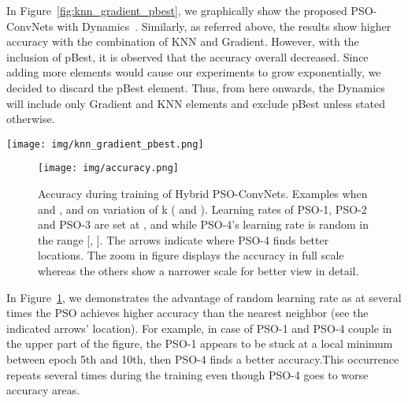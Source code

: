 \documentclass{ieeeaccess}
\begin{document}
In Figure~\ref{fig:knn_gradient_pbest}, we graphically show the proposed PSO-ConvNets with Dynamics~. Similarly, as referred above, the results show higher accuracy with the combination of KNN and Gradient. However, with the inclusion of pBest, it is observed that the accuracy overall decreased. Since adding more elements would cause our experiments to grow exponentially, we decided to discard the pBest element. Thus, from here onwards, the Dynamics~ will include only Gradient and KNN elements and exclude pBest unless stated otherwise.
\begin{figure*}[htb!]
\begin{center}
\texttt{[image: img/knn\_gradient\_pbest.png]}
\caption{Proposed PSO-ConvNets Dynamics~ (equation~\ref{eq:f1}). Comparison when KNN and Gradient are tested separated and combined, and also with the inclusion of pBest. Each column summaries the best accuracy of all PSOs (PSO-1, PSO-2, etc.). The red column highlights the best result for each group (KNN, Gradient, etc.).}
\label{fig:knn_gradient_pbest}
\end{center}
\end{figure*}
\begin{figure}[htb!]
\begin{center}
\texttt{[image: img/accuracy.png]}
\caption{Accuracy during training of Hybrid PSO-ConvNets. Examples when  and ,  and on variation of k ( and ). Learning rates of PSO-1, PSO-2 and PSO-3 are set at ,  and  while PSO-4's learning rate is random in the range [, ]. The arrows indicate where PSO-4 finds better locations. The zoom in figure displays the accuracy in full scale whereas the others show a narrower scale for better view in detail.}
\label{fig:accuracy}
\end{center}
\end{figure}


In Figure~\ref{fig:accuracy}, we demonstrates the advantage of random learning rate as at several times the PSO achieves higher accuracy than the nearest neighbor (see the indicated arrows' location). For example, in case of PSO-1 and PSO-4 couple in the upper part of the figure, the PSO-1 appears to be stuck at a local minimum between epoch 5th and 10th, then PSO-4 finds a better accuracy.This occurrence repeats several times during the training even though PSO-4 goes to worse accuracy areas. 
\end{document}
